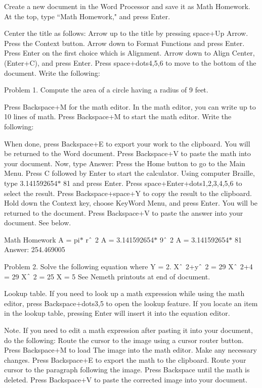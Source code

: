 \documentclass[10pt,letterpaper,twoside]{report}
\begin{document}
{{{Create a new document in the Word Processor and save it as Math Homework.
At the top, type ``Math Homework," and press Enter.

Center the title as follows:
Arrow up to the title by pressing space+Up Arrow.
Press the Context button.
Arrow down to Format Functions and press Enter.
Press Enter on the first choice which is Alignment.
Arrow down to Align Center, (Enter+C), and press Enter.
Press space+dots4,5,6 to move to the bottom of the document.
Write the following:

Problem 1. Compute the area of a circle having a radius of 9 feet.

Press Backspace+M for the math editor. In the math editor, you can write up to 10 lines of math.
Press Backspace+M to start the math editor.
Write the following:

When done, press Backspace+E to export your work to the clipboard. You will be returned to the Word document.
Press Backspace+V to paste the math into your document.
Now, type Answer: 
Press the Home button to go to the Main Menu.
Press C followed by Enter to start the calculator.
Using computer Braille, type 3.141592654$\ast$ 81 and press Enter.
Press space+Enter+dots1,2,3,4,5,6 to select the result.
Press Backspace+space+Y to copy the result to the clipboard.
Hold down the Context key, choose KeyWord Menu, and press Enter. You will be returned to the document.
Press Backspace+V to paste the answer into your document. See below.


Math Homework
A = pi$\ast$ r$ \string^ $ 2
A = 3.141592654$\ast$ 9$ \string^ $ 2
A = 3.141592654$\ast$ 81
Answer: 254.469005

Problem 2. Solve the following equation where Y = 2.
X$ \string^ $ 2+y$ \string^ $ 2 = 29
X$ \string^ $ 2+4 = 29
X$ \string^ $ 2 = 25
X = 5
See Nemeth printouts at end of document.


Lookup table. If you need to look up a math expression while using the math editor, press Backspace+dots3,5 to open the lookup feature. If you locate an item in the lookup table, pressing Enter will insert it into the equation editor.

Note. If you need to edit a math expression after pasting it into your document, do the following:
Route the cursor to the image using a cursor router button.
Press Backspace+M to load The image into the math editor.
Make any necessary changes.
Press Backspace+E to export the math to the clipboard.
Route your cursor to the paragraph following the image.
Press Backspace until the math is deleted.
Press Backspace+V to paste the corrected image into your document.

}}}
\end{document}
